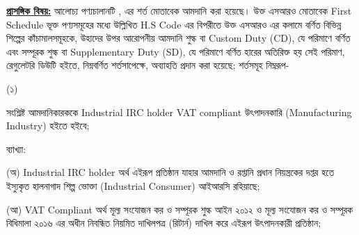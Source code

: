 \documentclass[12pt]{article}
\begin{document}
\begin{minipage}[t]{0.95\linewidth}
\underline{\textbf{প্রাসঙ্গিক বিষয়:}} আলোচ্য পণ্যচালানটি {\srooof}, {\srooofd}
এর শর্ত মোতাবেক আমদানি করা হয়েছে।
উক্ত এসআরও মোতাবেক First Schedule
ভূক্ত পণ্যসমূহের মধ্যে উল্লিখিত H.S Code
এর বিপরীতে উক্ত এসআরও এর কলামে বর্ণিত
বিভিন্ন শিল্পের কাঁচামালসমূহকে, উহাদের উপর
আরোপনীয় আমদানি শুল্ক বা Custom Duty (CD),
যে পরিমাণে বর্ণিত এবং সম্পূরক শুল্ক বা
Supplementary Duty (SD),
যে পরিমাণে বর্ণিত হারের অতিরিক্ত হয় সেই পরিমাণ,
রেগুলেটরি ডিউটি হইতে, নিম্নবর্ণিত শর্তসাপেক্ষে,
অব্যাহতি প্রদান করা হয়েছে; শর্তসমূহ নিম্নরূপ-
\\
\end{minipage}
\begin{minipage}[t]{0.05\linewidth}
\hspace{1em}
\end{minipage}
\begin{minipage}[t]{0.05\linewidth}
(১)
\end{minipage}
\begin{minipage}[t]{0.9\linewidth}
 সংশ্লিষ্ট আমদানিকারককে
 Industrial IRC holder VAT compliant
 উৎপাদনকারি (Manufacturing Industry) হইতে
 হইবে;
 \\
\end{minipage}
\begin{minipage}[t]{0.1\linewidth}
\hspace{1em}
\end{minipage}
\begin{minipage}[t]{0.9\linewidth}
ব্যাখ্যা:
 \\
\end{minipage}
\begin{minipage}[t]{0.1\linewidth}
\hspace{1em}
\end{minipage}
\begin{minipage}[t]{0.9\linewidth}
(অ) Industrial IRC holder অর্থ
এইরূপ প্রতিষ্ঠান যাহার আমদানি ও রপ্তানি
প্রধান নিয়ন্ত্রকের দপ্তর হতে ইস্যুকৃত হালনাগাদ
শিল্প ভোক্তা (Industrial Consumer) আইআরসি
রহিয়াছে;
\\
\end{minipage}
\begin{minipage}[t]{0.1\linewidth}
\hspace{1em}
\end{minipage}
\begin{minipage}[t]{0.9\linewidth}
(আ) VAT Compliant অর্থ মূল্য
সংযোজন কর ও সম্পূরক শুল্ক আইন ২০১২
ও মূল্য সংযোজন কর ও সম্পূরক বিধিমালা ২০১৬
এর অধীন নিবন্ধিত নিয়মিত দাখিলপত্র (রিটার্ন) দাখিল
করে এইরূপ উৎপাদনকারী প্রতিষ্ঠান;
\\
\end{minipage}
\end{document}
